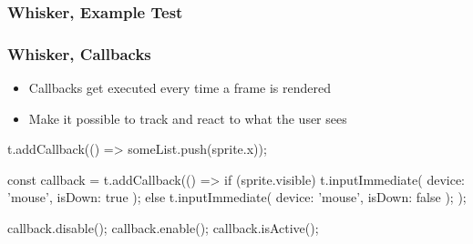 \begin{frame}[fragile]\frametitle{Whisker, Example Test}
    \vspace{-\bigskipamount}
    \begin{minipage}{.7\textwidth}\end{minipage}
\end{frame}

\begin{frame}[fragile]\frametitle{Whisker, Callbacks}
    \begin{itemize}
        \item Callbacks get executed every time a frame is rendered
        \item Make it possible to \textcolor{upfim}{track} and \textcolor{upfim}{react} to what the user sees
    \end{itemize}

    \begin{javascriptcode}
        t.addCallback(() => someList.push(sprite.x));

        const callback = t.addCallback(() => {
            if (sprite.visible) {
                t.inputImmediate({ device: 'mouse', isDown: true });
            } else {
                t.inputImmediate({ device: 'mouse', isDown: false });
            }
        });

        callback.disable();
        callback.enable();
        callback.isActive();
    \end{javascriptcode}
\end{frame}

